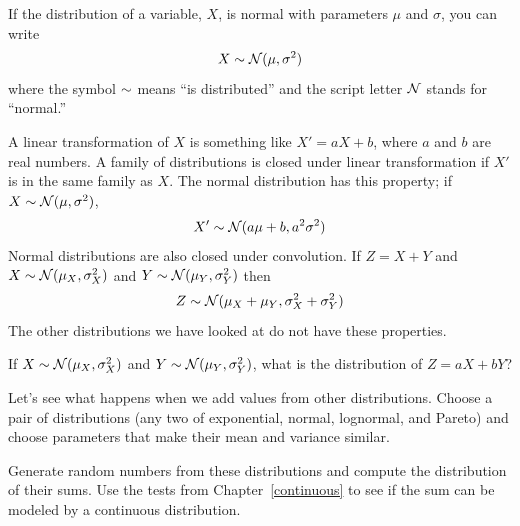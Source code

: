 \documentclass[12pt]{book}
\begin{document}

If the distribution of a variable, $X$, is
normal with parameters $\mu$ and $\sigma$, you can write
%
\[ X \sim \mathcal{N} (\mu, \sigma^2) \]
%
where the symbol $\sim$ means ``is distributed'' and the script letter
$\mathcal{N}$ stands for ``normal.''



A linear transformation of $X$ is something like $X' = aX + b$, where $a$
and $b$ are real numbers.  A family of distributions is closed under
linear transformation if $X'$ is in the same family as $X$.  The normal
distribution has this property; if $X \sim \mathcal{N} (\mu,
\sigma^2)$,
%
\[ X' \sim \mathcal{N} (a \mu + b, a^2 \sigma^2) \]
%
Normal distributions are also closed under convolution.  
If $Z = X+Y$ and
$X \sim \mathcal{N} (\mu_X, \sigma_X^2)$ and
$Y \sim \mathcal{N} (\mu_Y, \sigma_Y^2)$ then
%
\[ Z \sim \mathcal{N} (\mu_X + \mu_Y, \sigma_X^2 + \sigma_Y^2) \]
%
The other distributions we have looked at do not have these
properties.


\begin{ex}

If 
$X \sim \mathcal{N} (\mu_X, \sigma_X^2)$ and
$Y \sim \mathcal{N} (\mu_Y, \sigma_Y^2)$, what is the distribution
of $Z = aX + bY$?

\end{ex}

\begin{ex}


Let's see what happens when we add values from
other distributions.  Choose a pair of distributions (any two of
exponential, normal, lognormal, and Pareto) and choose parameters
that make their mean and variance similar.


Generate random numbers from these distributions and compute the
distribution of their sums.  Use the tests from
Chapter~\ref{continuous} to see if the sum can be modeled by a
continuous distribution.

\end{ex}
\end{document}
